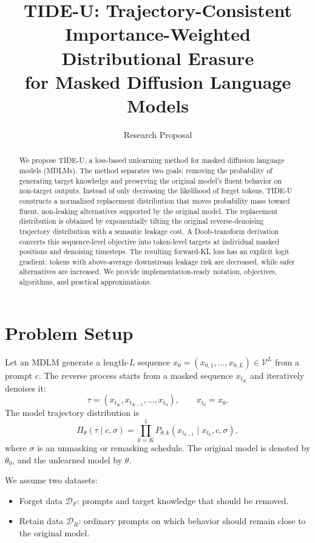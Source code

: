\documentclass[10pt]{article}
\title{TIDE-U: Trajectory-Consistent Importance-Weighted Distributional Erasure\\for Masked Diffusion Language Models}
\author{Research Proposal}
\date{}
\newcommand{\V}{\mathcal{V}}
\newcommand{\DF}{\mathcal{D}_{F}}
\newcommand{\DR}{\mathcal{D}_{R}}
\newcommand{\1}{\mathbb{I}}
\begin{document}
\maketitle

\begin{abstract}
We propose TIDE-U, a loss-based unlearning method for masked diffusion language models (MDLMs). The method separates two goals: removing the probability of generating target knowledge and preserving the original model's fluent behavior on non-target outputs. Instead of only decreasing the likelihood of forget tokens, TIDE-U constructs a normalized replacement distribution that moves probability mass toward fluent, non-leaking alternatives supported by the original model. The replacement distribution is obtained by exponentially tilting the original reverse-denoising trajectory distribution with a semantic leakage cost. A Doob-transform derivation converts this sequence-level objective into token-level targets at individual masked positions and denoising timesteps. The resulting forward-KL loss has an explicit logit gradient: tokens with above-average downstream leakage risk are decreased, while safer alternatives are increased. We provide implementation-ready notation, objectives, algorithms, and practical approximations.
\end{abstract}

\section{Problem Setup}

Let an MDLM generate a length-$L$ sequence $x_0=(x_{0,1},\ldots,x_{0,L})\in\V^L$ from a prompt $c$. The reverse process starts from a masked sequence $x_{t_K}$ and iteratively denoises it:
\begin{equation}
\tau=(x_{t_K},x_{t_{K-1}},\ldots,x_{t_0}),\qquad x_{t_0}=x_0.
\end{equation}
The model trajectory distribution is
\begin{equation}
\Pi_{\theta}(\tau\mid c,\sigma)
=
\prod_{k=K}^{1}
P_{\theta,k}(x_{t_{k-1}}\mid x_{t_k},c,\sigma),
\label{eq:trajectory}
\end{equation}
where $\sigma$ is an unmasking or remasking schedule. The original model is denoted by $\theta_0$, and the unlearned model by $\theta$.

We assume two datasets:
\begin{itemize}[leftmargin=*]
    \item Forget data $\DF$: prompts and target knowledge that should be removed.
    \item Retain data $\DR$: ordinary prompts on which behavior should remain close to the original model.
\end{itemize}
\end{document}
